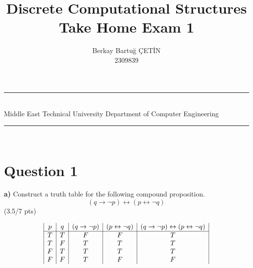 \documentclass[a4paper,12pt]{article}
\title{Discrete Computational Structures \\ Take Home Exam 1}
\author{Berkay Bartuğ ÇETİN \\ 2309839} %
\date{} %
\newcommand{\HRule}{\rule{\linewidth}{1mm}}
\newcommand\tab[1][1cm]{\hspace*{#1}}
\begin{document}
\HRule\\
Middle East Technical University \hfill Department of Computer Engineering
{\let\newpage\relax\maketitle}
\HRule\\
\vspace{1cm}


\newpage
\section*{Question 1 \hfill {}}

\tab \textbf{a)} Construct a truth table for the following compound proposition.
\begin{equation*}
    (q \rightarrow \neg p)\leftrightarrow (p \leftrightarrow \neg q)
\end{equation*} 
\hfill \small{(3.5/7 pts)} \\
\begin{tcolorbox}
\begin{displaymath}
\begin{array}{|c |c|c|c|c|}
p & q & (q \rightarrow \neg p) & (p \leftrightarrow \neg q) &(q \rightarrow \neg p)\leftrightarrow (p \leftrightarrow \neg q) \\
\hline
T & T & F & F & T\\
T & F & T & T & T\\
F & T & T & T & T\\
F & F & T & F & F\\
\end{array}
\end{displaymath}

\end{tcolorbox}
\end{document}
